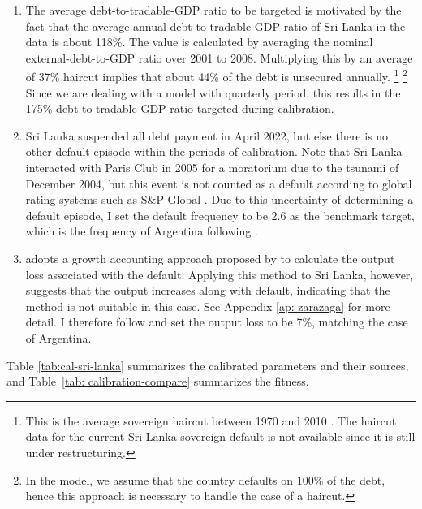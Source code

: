 \begin{enumerate}[label = (\roman*)]
    \item
    The average debt-to-tradable-GDP ratio to be targeted is motivated by the fact that the average annual debt-to-tradable-GDP ratio of Sri Lanka in the data is about 118\%.
    The value is calculated by averaging the nominal external-debt-to-GDP ratio over 2001 to 2008.\footnotemark{}
    Multiplying this by an average of 37\% haircut implies that about 44\% of the debt is unsecured annually.%
    \footnote{
        This is the average sovereign haircut between 1970 and 2010 \citep{Cruces-Trebesch-13}. The haircut data for the current Sri Lanka sovereign default is not available since it is still under restructuring.
        }%
    \footnote{
        In the model, we assume that the country defaults on 100\% of the debt, hence this approach is necessary to handle the case of a haircut.
        }
    Since we are dealing with a model with quarterly period, this results in the 175\% debt-to-tradable-GDP ratio targeted during calibration.
    \item
    Sri Lanka suspended all debt payment in April 2022, but else there is no other default episode within the periods of calibration. Note that Sri Lanka interacted with Paris Club in 2005 for a moratorium due to the tsunami of December 2004, but this event is not counted as a default according to global rating systems such as S\&P Global \citep{SPGlobal-default-report}.
    Due to this uncertainty of determining a default episode, I set the default frequency to be 2.6 as the benchmark target, which is the frequency of Argentina following \citet{Na-18}.
    \item  \citet{Na-18} adopts a growth accounting approach proposed by \citet{zarazaga-12} to calculate the output loss associated with the default. Applying this method to Sri Lanka, however, suggests that the output increases along with default, indicating that the method is not suitable in this case. See Appendix \ref{ap: zarazaga} for more detail. I therefore follow \citet{Na-18} and set the output loss to be 7\%, matching the case of Argentina.
\end{enumerate}
Table \ref{tab:cal-sri-lanka} summarizes the calibrated parameters and their sources, and Table~\ref{tab: calibration-compare} summarizes the fitness.


